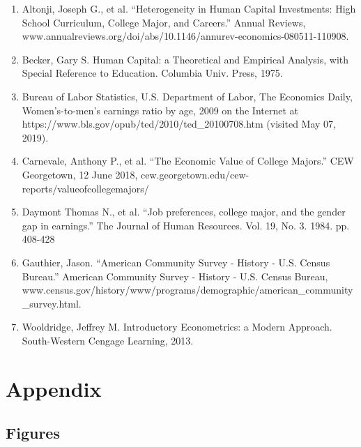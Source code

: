 \documentclass[12pt]{article}
\begin{document}
\begin{enumerate}
\item Altonji, Joseph G., et al. “Heterogeneity in Human Capital Investments: High School Curriculum, College Major, and Careers.” Annual Reviews, \\ www.annualreviews.org/doi/abs/10.1146/annurev-economics-080511-110908.

\item Becker, Gary S. Human Capital: a Theoretical and Empirical Analysis, with Special Reference to Education. Columbia Univ. Press, 1975.

\item Bureau of Labor Statistics, U.S. Department of Labor, The Economics Daily, Women’s-to-men’s earnings ratio by age, 2009 on the Internet at \\ https://www.bls.gov/opub/ted/2010/ted\_20100708.htm (visited May 07, 2019).

\item Carnevale, Anthony P., et al. “The Economic Value of College Majors.” CEW Georgetown, 12 June 2018, cew.georgetown.edu/cew-reports/valueofcollegemajors/ 

\item Daymont Thomas N., et al. “Job preferences, college major, and the gender gap in earnings.” 
The Journal of Human Resources. Vol. 19, No. 3. 1984. pp. 408-428

\item Gauthier, Jason. “American Community Survey - History - U.S. Census Bureau.” American Community Survey - History - U.S. Census Bureau, \\
www.census.gov/history/www/programs/demographic/american\_community\_survey.html.

\item Wooldridge, Jeffrey M. Introductory Econometrics: a Modern Approach. South-Western Cengage Learning, 2013.
\end{enumerate}

\section{Appendix}

\subsection{Figures}
\end{document}
